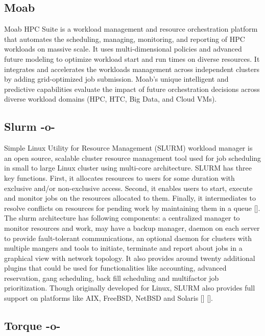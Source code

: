 \subsection{Moab}

Moab HPC Suite is a workload management and resource orchestration
platform that automates the scheduling, managing, monitoring, and
reporting of HPC workloads on massive scale. It uses multi-dimensional
policies and advanced future modeling to optimize workload start and
run times on diverse resources. It integrates and accelerates the
workloads management across independent clusters by adding
grid-optimized job submission. Moab's unique intelligent and
predictive capabilities evaluate the impact of future orchestration
decisions across diverse workload domains (HPC, HTC, Big Data, and
Cloud VMs)\cite{www-moab}.

\subsection{Slurm -o-}

Simple Linux Utility for Resource Management (SLURM) workload manager
is an open source, scalable cluster resource management tool used for
job scheduling in small to large Linux cluster using multi-core
architecture. SLURM has three key functions. First, it allocates
resources to users for some duration with exclusive and/or
non-exclusive access. Second, it enables users to start, execute and
monitor jobs on the resources allocated to them. Finally, it
intermediates to resolve conflicts on resources for pending work by
maintaining them in a queue [\cite{www-slurmSchedmdSite}]. The slurm
architecture has following components: a centralized manager to
monitor resources and work, may have a backup manager, daemon on each
server to provide fault-tolerant communications, an optional daemon
for clusters with multiple mangers and tools to initiate, terminate
and report about jobs in a graphical view with network topology. It
also provides around twenty additional plugins that could be used for
functionalities like accounting, advanced reservation, gang
scheduling, back fill scheduling and multifactor job
prioritization. Though originally developed for Linux, SLURM also
provides full support on platforms like AIX, FreeBSD, NetBSD and
Solaris [\cite{www-slurmPlatformsSite}] [\cite{www-slurm}].


     
\subsection{Torque -o-}



